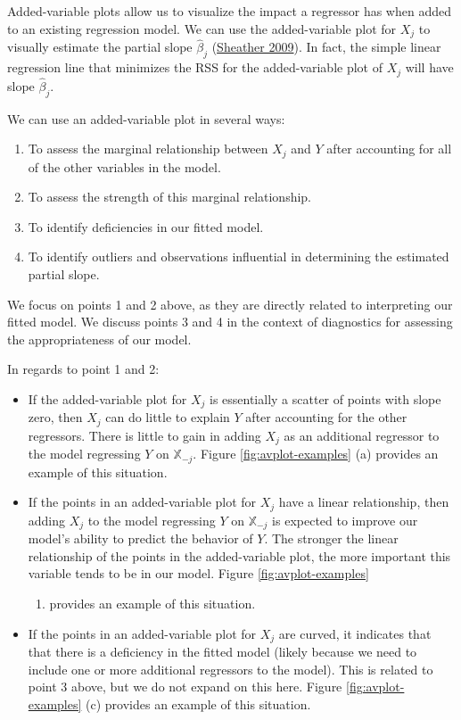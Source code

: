 \documentclass[
]{book}
\providecommand{\tightlist}{%
  \setlength{\itemsep}{0pt}\setlength{\parskip}{0pt}}
\theoremstyle{definition}
\theoremstyle{definition}
\theoremstyle{definition}
\theoremstyle{definition}
\theoremstyle{remark}
\begin{document}
Added-variable plots allow us to visualize the impact a regressor has
when added to an existing regression model. We can use the
added-variable plot for \(X_j\) to visually estimate the partial slope
\(\hat{\beta}_{j}\) (\protect\hyperlink{ref-sheather2009modern}{Sheather 2009}). In fact, the simple linear
regression line that minimizes the RSS for the added-variable plot of
\(X_j\) will have slope \(\hat{\beta}_j\).

We can use an added-variable plot in several ways:

\begin{enumerate}
\def\labelenumi{\arabic{enumi}.}
\tightlist
\item
  To assess the marginal relationship between \(X_j\) and \(Y\) after
  accounting for all of the other variables in the model.
\item
  To assess the strength of this marginal relationship.
\item
  To identify deficiencies in our fitted model.
\item
  To identify outliers and observations influential in determining the
  estimated partial slope.
\end{enumerate}

We focus on points 1 and 2 above, as they are directly related to
interpreting our fitted model. We discuss points 3 and 4 in the context
of diagnostics for assessing the appropriateness of our model.

In regards to point 1 and 2:

\begin{itemize}
\tightlist
\item
  If the added-variable plot for \(X_j\) is essentially a scatter of
  points with slope zero, then \(X_j\) can do little to explain \(Y\)
  after accounting for the other regressors. There is little to gain
  in adding \(X_j\) as an additional regressor to the model regressing
  \(Y\) on \(\mathbb{X}_{-j}\). Figure \ref{fig:avplot-examples} (a)
  provides an example of this situation.
\item
  If the points in an added-variable plot for \(X_j\) have a linear
  relationship, then adding \(X_j\) to the model regressing \(Y\) on
  \(\mathbb{X}_{-j}\) is expected to improve our model's ability to
  predict the behavior of \(Y\). The stronger the linear relationship of
  the points in the added-variable plot, the more important this
  variable tends to be in our model. Figure \ref{fig:avplot-examples}

  \begin{enumerate}
  \def\labelenumi{(\alph{enumi})}
  \setcounter{enumi}{1}
  \tightlist
  \item
    provides an example of this situation.
  \end{enumerate}
\item
  If the points in an added-variable plot for \(X_j\) are curved, it
  indicates that that there is a deficiency in the fitted model
  (likely because we need to include one or more additional regressors
  to the model). This is related to point 3 above, but we do not
  expand on this here. Figure \ref{fig:avplot-examples} (c) provides
  an example of this situation.
\end{itemize}
\end{document}
